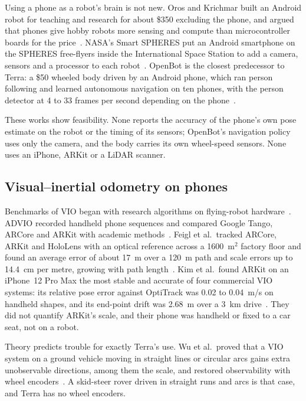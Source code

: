 Using a phone as a robot's brain is not new.
Oros and Krichmar built an Android robot for teaching and research for about \$350 excluding the phone, and argued that phones give hobby robots more sensing and compute than microcontroller boards for the price~\citep{oros2013smartphone}.
NASA's Smart SPHERES put an Android smartphone on the SPHERES free-flyers inside the International Space Station to add a camera, sensors and a processor to each robot~\citep{fong2013smartspheres}.
OpenBot is the closest predecessor to Terra: a \$50 wheeled body driven by an Android phone, which ran person following and learned autonomous navigation on ten phones, with the person detector at 4 to 33 frames per second depending on the phone~\citep{muller2021openbot}.

These works show feasibility.
None reports the accuracy of the phone's own pose estimate on the robot or the timing of its sensors; OpenBot's navigation policy uses only the camera, and the body carries its own wheel-speed sensors.
None uses an iPhone, ARKit or a LiDAR scanner.

\subsection{Visual--inertial odometry on phones}

Benchmarks of VIO began with research algorithms on flying-robot hardware~\citep{delmerico2018benchmark}.
ADVIO recorded handheld phone sequences and compared Google Tango, ARCore and ARKit with academic methods~\citep{cortes2018advio}.
Feigl et al.\ tracked ARCore, ARKit and HoloLens with an optical reference across a 1600~m$^2$ factory floor and found an average error of about 17~m over a 120~m path and scale errors up to 14.4~cm per metre, growing with path length~\citep{feigl2020localization}.
Kim et al.\ found ARKit on an iPhone~12 Pro Max the most stable and accurate of four commercial VIO systems: its relative pose error against OptiTrack was 0.02 to 0.04~m/s on handheld shapes, and its end-point drift was 2.68~m over a 3~km drive~\citep{kim2022benchmark}.
They did not quantify ARKit's scale, and their phone was handheld or fixed to a car seat, not on a robot.

Theory predicts trouble for exactly Terra's use.
Wu et al.\ proved that a VIO system on a ground vehicle moving in straight lines or circular arcs gains extra unobservable directions, among them the scale, and restored observability with wheel encoders~\citep{wu2017vinswheels}.
A skid-steer rover driven in straight runs and arcs is that case, and Terra has no wheel encoders.

